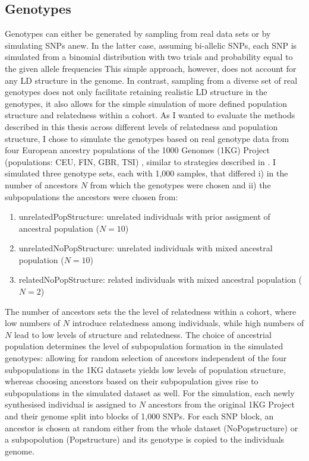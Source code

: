 \subsection{Genotypes}
\label{subsection:genotypes}
Genotypes can either be generated by sampling from real data sets or by simulating SNPs anew. In the latter case, assuming bi-allelic SNPs, each SNP is simulated from a binomial distribution with two trials and probability equal to the given allele frequencies  This simple approach, however, does not account for any LD structure in the genome. In contrast, sampling from a diverse set of real genotypes does not only facilitate retaining realistic LD structure in the genotypes, it also allows for the simple simulation of more defined population structure and relatedness within a cohort. As I wanted to evaluate the methods described in this thesis across different levels of relatedness and population structure, 
I chose to simulate the genotypes based on real genotype data from four European ancestry populations of the 1000 Genomes (1KG) Project (populations: CEU, FIN, GBR, TSI) \citep{Abecasis2012}, similar to strategies described in \citep{Loh2014,Casale2015}. I simulated three genotype sets, each with 1,000 samples, that differed i) in the number of ancestors \(N\) from which the genotypes were chosen and ii) the subpopulations the ancestors were chosen from:
\begin{enumerate}
\item unrelatedPopStructure: unrelated individuals with prior assigment of ancestral population  (\(N=10\))
\item unrelatedNoPopStructure: unrelated individuals with mixed ancestral population  (\(N=10\))
\item relatedNoPopStructure: related individuals with mixed ancestral population (\(N=2\))
\end{enumerate}

The number of ancestors sets the the level of relatedness within a cohort, where low numbers of \(N\) introduce relatedness among individuals, while high numbers of \(N\) lead to low levels of structure and relatedness. The choice of ancestrial population determines the level of subpopulation formation in the simulated genotypes: allowing for random selection of ancestors independent of the four subpopulations in the 1KG datasets yields low levels of population structure, whereas choosing ancestors based on their subpopulation gives rise to subpopulations in the simulated dataset as well. 
For the simulation, each newly synthesised individual is assigned to \(N\) ancestors from the original 1KG Project and their genome split into blocks of 1,000 SNPs. For each SNP block, an ancestor is chosen at random either from the whole dataset (NoPopstructure) or a subpopolution (Popstructure)  and its genotype is copied to the individuals genome. 

